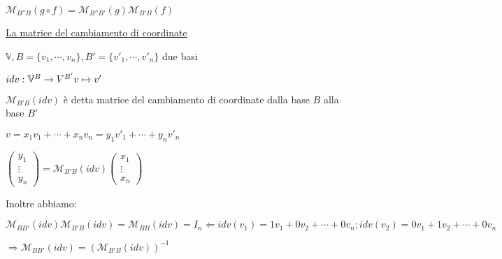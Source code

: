 \documentclass{article}
\newcommand{\ul}[1]{\underline{#1}}
\newcommand{\V}{\mathbb{V}}
\newcommand{\M}{\mathcal{M}}
\begin{document}
$\M_{B''B}(g\circ f)=\M_{B''B'}(g)\M_{B'B}(f)$

	\ul{La matrice del cambiamento di coordinate}

$\V, B=\{v_1,\cdots,v_n\}, B'=\{v'_1,\cdots,v'_n\}$ due basi

$idv:\V^B\rightarrow V^{B'}\\v\mapsto v'$

$\M_{B'B}(idv)$ è detta matrice del cambiamento di coordinate dalla base $B$ alla base $B'$

$v=x_1v_1+\cdots+x_nv_n=y_1v'_1+\cdots+y_nv'_n$

$\begin{pmatrix}y_1\\\vdots\\y_n\end{pmatrix}=\M_{B'B}(idv)\begin{pmatrix}x_1\\\vdots\\x_n\end{pmatrix}$

	Inoltre abbiamo:

$\M_{BB'}(idv)\M_{B'B}(idv)=\M_{BB}(idv)=I_n\Leftarrow idv(v_1)=1v_1+0v_2+\cdots+0v_n;idv(v_2)=0v_1+1v_2+\cdots+0v_n$

$\Rightarrow\M_{BB'}(idv)=(\M_{B'B}(idv))^{-1}$
\end{document}
